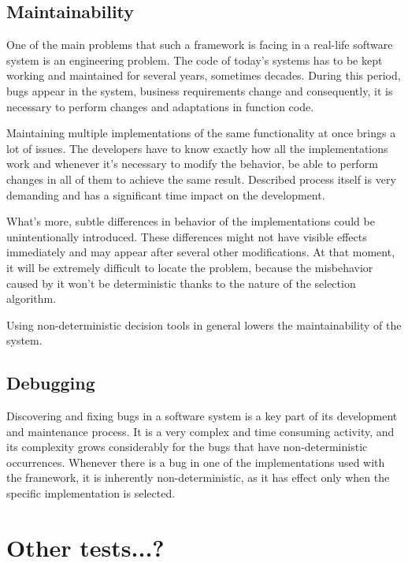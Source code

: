 \subsection{Maintainability}

One of the main problems that such a framework is facing in a real-life software system is an engineering problem. The code of today's systems has to be kept working and maintained for several years, sometimes decades. During this period, bugs appear in the system, business requirements change and consequently, it is necessary to perform changes and adaptations in function code.

Maintaining multiple implementations of the same functionality at once brings a lot of issues. The developers have to know exactly how all the implementations work and whenever it's necessary to modify the behavior, be able to perform changes in all of them to achieve the same result. Described process itself is very demanding and has a significant time impact on the development. 

What's more, subtle differences in behavior of the implementations could be unintentionally introduced. These differences might not have visible effects immediately and may appear after several other modifications. At that moment, it will be extremely difficult to locate the problem, because the misbehavior caused by it won't be deterministic thanks to the nature of the selection algorithm.

Using non-deterministic decision tools in general lowers the maintainability of the system.

\subsection{Debugging}

Discovering and fixing bugs in a software system is a key part of its development and maintenance process. It is a very complex and time consuming activity, and its complexity grows considerably for the bugs that have non-deterministic occurrences. Whenever there is a bug in one of the implementations used with the framework, it is inherently non-deterministic, as it has effect only when the specific implementation is selected.

\section{Other tests...?}